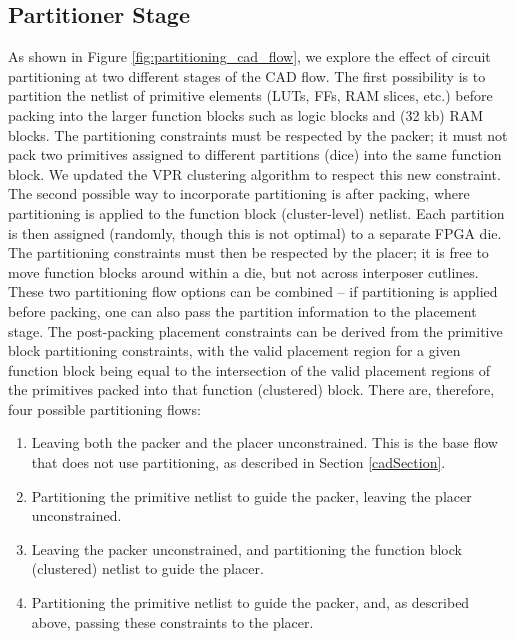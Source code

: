 \subsection{Partitioner Stage}\label{sec:partitioner_stage}
As shown in Figure \ref{fig:partitioning_cad_flow}, we explore the effect of circuit partitioning at two different stages of the CAD flow. The first possibility is to partition the netlist of primitive elements (LUTs, FFs, RAM slices, etc.) before packing into the larger function blocks such as logic blocks and (32 kb) RAM blocks. The partitioning constraints must be respected by the packer; it must not pack two primitives assigned to different partitions (dice) into the same function block. We updated the VPR clustering algorithm to respect this new constraint. The second possible way to incorporate partitioning is after packing, where partitioning is applied to the function block (cluster-level) netlist. Each partition is then assigned (randomly, though this is not optimal) to a separate FPGA die. The partitioning constraints must then be respected by the placer; it is free to move function blocks around within a die, but not across interposer cutlines. These two partitioning flow options can be combined -- if partitioning is applied before packing, one can also pass the partition information to the placement stage. The post-packing placement constraints can be derived from the primitive block partitioning constraints, with the valid placement region for a given function block being equal to the intersection of the valid placement regions of the primitives packed into that function (clustered) block. There are, therefore, four possible partitioning flows:

\begin{enumerate}[label=(\roman*)]
  \item Leaving both the packer and the placer unconstrained. This is the base flow that does not use partitioning, as described in Section \ref{cadSection}.
  \item Partitioning the primitive netlist to guide the packer, leaving the placer unconstrained.
  \item Leaving the packer unconstrained, and partitioning the function block (clustered) netlist to guide the placer.
  \item Partitioning the primitive netlist to guide the packer, and, as described above, passing these constraints to the placer.
\end{enumerate}

